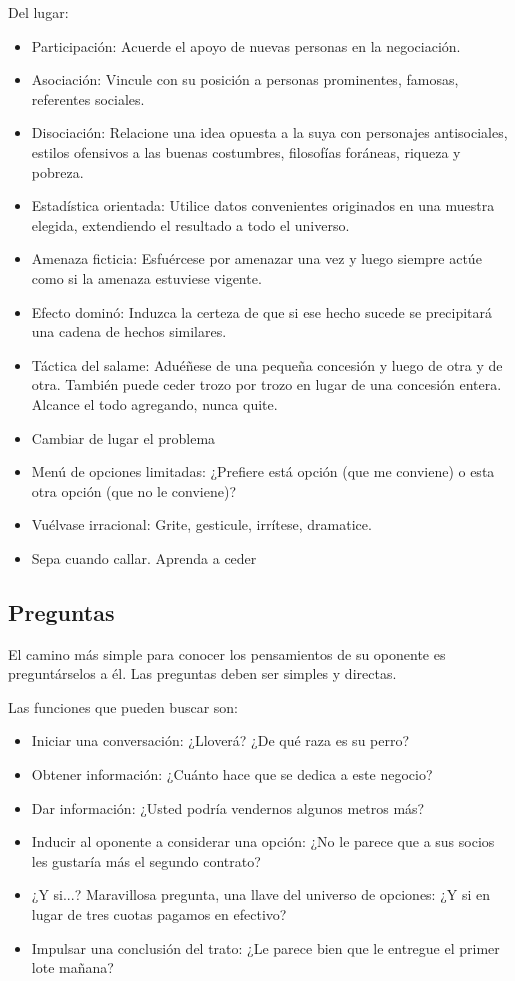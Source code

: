 \documentclass[titlepage,a4paper]{article}
\begin{document}
Del lugar:
\begin{itemize}
    \item Participación: Acuerde el apoyo de nuevas personas en la negociación.
    \item Asociación: Vincule con su posición a personas prominentes, famosas, referentes sociales.
    \item Disociación: Relacione una idea opuesta a la suya con personajes antisociales, estilos ofensivos a las buenas costumbres, filosofías foráneas, riqueza y pobreza.
    \item Estadística orientada: Utilice datos convenientes originados en una muestra elegida, extendiendo el resultado a todo el universo.
    \item Amenaza ficticia: Esfuércese por amenazar una vez y luego siempre actúe como si la amenaza estuviese vigente.
    \item Efecto dominó: Induzca la certeza de que si ese hecho sucede se precipitará una cadena de hechos similares.
    \item Táctica del salame: Aduéñese de una pequeña concesión y luego de otra y de otra. También puede ceder trozo por trozo en lugar de una concesión entera. Alcance el todo agregando, nunca quite.
    \item Cambiar de lugar el problema
    \item Menú de opciones limitadas: ¿Prefiere está opción (que me conviene) o esta otra opción (que no le conviene)?
    \item Vuélvase irracional: Grite, gesticule, irrítese, dramatice.
    \item Sepa cuando callar. Aprenda a ceder
\end{itemize}

\subsection*{Preguntas}
El camino más simple para conocer los pensamientos de su oponente es preguntárselos a él. Las preguntas deben ser simples y directas.

Las funciones que pueden buscar son:
\begin{itemize}
    \item Iniciar una conversación: ¿Lloverá? ¿De qué raza es su perro?
    \item Obtener información: ¿Cuánto hace que se dedica a este negocio?
    \item Dar información: ¿Usted podría vendernos algunos metros más?
    \item Inducir al oponente a considerar una opción: ¿No le parece que a sus socios les gustaría más el segundo contrato?
    \item ¿Y si...? Maravillosa pregunta, una llave del universo de opciones: ¿Y si en lugar de tres cuotas pagamos en efectivo?
    \item Impulsar una conclusión del trato: ¿Le parece bien que le entregue el primer lote mañana?
\end{itemize}
\end{document}
